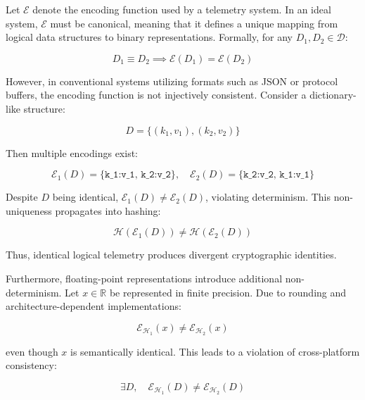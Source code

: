 Let $\mathcal{E}$ denote the encoding function used by a telemetry system. In an ideal system, $\mathcal{E}$ must be canonical, meaning that it defines a unique mapping from logical data structures to binary representations. Formally, for any $D_1, D_2 \in \mathcal{D}$:

\begin{equation}
D_1 \equiv D_2 \implies \mathcal{E}(D_1) = \mathcal{E}(D_2)
\end{equation}

However, in conventional systems utilizing formats such as JSON or protocol buffers, the encoding function is not injectively consistent. Consider a dictionary-like structure:

\begin{equation}
D = \{(k_1, v_1), (k_2, v_2)\}
\end{equation}

Then multiple encodings exist:

\begin{equation}
\mathcal{E}_1(D) = \texttt{\{k_1:v_1, k_2:v_2\}}, \quad
\mathcal{E}_2(D) = \texttt{\{k_2:v_2, k_1:v_1\}}
\end{equation}

Despite $D$ being identical, $\mathcal{E}_1(D) \neq \mathcal{E}_2(D)$, violating determinism. This non-uniqueness propagates into hashing:

\begin{equation}
\mathcal{H}(\mathcal{E}_1(D)) \neq \mathcal{H}(\mathcal{E}_2(D))
\end{equation}

Thus, identical logical telemetry produces divergent cryptographic identities.

Furthermore, floating-point representations introduce additional non-determinism. Let $x \in \mathbb{R}$ be represented in finite precision. Due to rounding and architecture-dependent implementations:

\begin{equation}
\mathcal{E}_{\mathcal{H}_1}(x) \neq \mathcal{E}_{\mathcal{H}_2}(x)
\end{equation}

even though $x$ is semantically identical. This leads to a violation of cross-platform consistency:

\begin{equation}
\exists D, \quad \mathcal{E}_{\mathcal{H}_1}(D) \neq \mathcal{E}_{\mathcal{H}_2}(D)
\end{equation}

